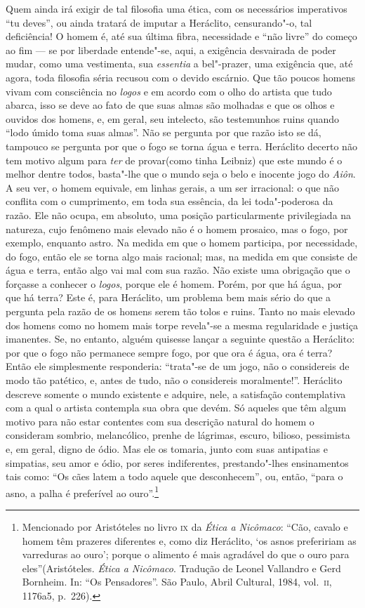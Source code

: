 Quem ainda irá exigir de tal filosofia uma ética, com os necessários
imperativos ``tu deves'', ou ainda tratará de imputar a Heráclito,
censurando"-o, tal deficiência! O homem é, até sua última fibra, necessidade
e ``não livre'' do começo ao fim --- se por liberdade entende"-se, aqui, a
exigência desvairada de poder mudar, como uma vestimenta, sua \textit{essentia} 
a bel"-prazer, uma exigência que, até agora, toda filosofia séria recusou com 
o devido escárnio. Que tão poucos homens vivam com consciência no \textit{logos} 
e em acordo com o olho do artista que tudo abarca, isso se deve ao fato de que 
suas almas são molhadas e que os olhos e ouvidos dos homens, e, em geral, 
seu intelecto, são testemunhos ruins quando ``lodo úmido toma suas almas''. 
Não se pergunta por que razão isto se dá, tampouco se pergunta por que o fogo 
se torna água e terra. Heráclito decerto não tem motivo algum para \textit{ter} 
de provar(como tinha Leibniz) que este mundo é o melhor dentre todos, basta"-lhe 
que o mundo seja o belo e inocente jogo do \textit{Aiôn}. A seu ver, o homem equivale, 
em linhas gerais, a um ser irracional: o que não conflita com o cumprimento, em toda 
sua essência, da lei toda"-poderosa da razão. Ele não ocupa, em absoluto, uma posição
particularmente privilegiada na natureza, cujo fenômeno mais elevado não é o
homem prosaico, mas o fogo, por exemplo, enquanto astro. Na medida em que o
homem participa, por necessidade, do fogo, então ele se torna algo mais
racional; mas, na medida em que consiste de água e terra, então algo vai mal
com sua razão. Não existe uma obrigação que o forçasse a conhecer o \textit{logos}, 
porque ele é homem. Porém, por que há água, por que há terra? Este é, para Heráclito, 
um problema bem mais sério do que a pergunta pela razão de
os homens serem tão tolos e ruins. Tanto no mais elevado dos homens como no
homem mais torpe revela"-se a mesma regularidade e justiça imanentes. Se, no
entanto, alguém quisesse lançar a seguinte questão a Heráclito: por que o
fogo não permanece sempre fogo, por que ora é água, ora é terra? Então ele
simplesmente responderia: ``trata"-se de um jogo, não o considereis de modo
tão patético, e, antes de tudo, não o considereis moralmente!''. Heráclito
descreve somente o mundo existente e adquire, nele, a satisfação
contemplativa com a qual o artista contempla sua obra que devém. Só aqueles
que têm algum motivo para não estar contentes com sua descrição natural do
homem o consideram sombrio, melancólico, prenhe de lágrimas, escuro, bilioso,
pessimista e, em geral, digno de ódio. Mas ele os tomaria, junto com suas
antipatias e simpatias, seu amor e ódio, por seres indiferentes,
prestando"-lhes ensinamentos tais como: ``Os cães latem a todo aquele que
desconhecem'', ou, então, ``para o asno, a palha é preferível ao
ouro''.\footnote{Mencionado por Aristóteles no livro \textsc{ix} da \textit{Ética 
a Nicômaco}: ``Cão, cavalo e homem têm prazeres diferentes e, como diz
Heráclito, `os asnos prefeririam as varreduras ao ouro'; porque o alimento é
mais agradável do que o ouro para eles''(Aristóteles. \textit{Ética a
Nicômaco}. Tradução de Leonel Vallandro e Gerd Bornheim. In: ``Os
Pensadores''. São Paulo, Abril Cultural, 1984, vol.~\textsc{ii}, 1176a5,
p.~226).}


